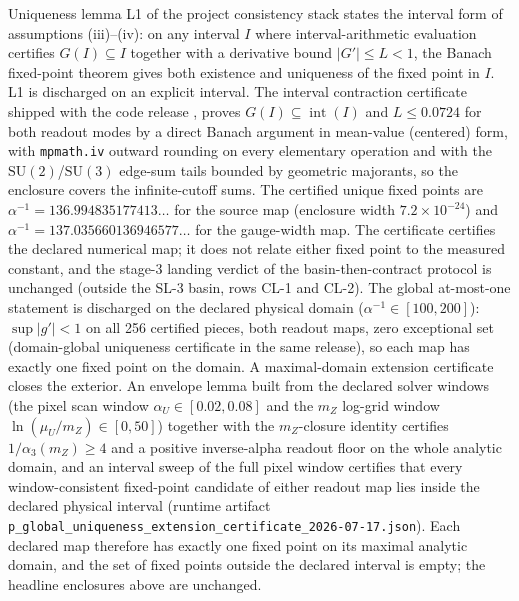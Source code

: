 \documentclass[11pt]{article}
\theoremstyle{remark}
\newcommand{\SU}{\mathrm{SU}}
\begin{document}
Uniqueness lemma L1 of the project consistency stack
states the interval form of assumptions
(iii)--(iv): on any interval \(I\) where interval-arithmetic evaluation
certifies \(G(I)\subseteq I\) together with a derivative bound
\(|G'|\le L<1\), the Banach fixed-point theorem gives both existence and
uniqueness of the fixed point in \(I\). L1 is discharged on an explicit
interval. The interval contraction certificate shipped with
the code release \cite{oph-code},
proves \(G(I)\subseteq\operatorname{int}(I)\) and \(L\le0.0724\) for both
readout modes by a direct Banach argument in mean-value (centered) form, with
\texttt{mpmath.iv} outward rounding on every elementary operation and with the
\(\SU(2)\)/\(\SU(3)\) edge-sum tails bounded by geometric majorants, so the
enclosure covers the infinite-cutoff sums. The certified unique fixed points
are \(\alpha^{-1}=136.994835177413\ldots\) for the source map (enclosure width
\(7.2\times10^{-24}\)) and \(\alpha^{-1}=137.035660136946577\ldots\) for the
gauge-width map. The certificate certifies the declared numerical map; it does
not relate either fixed point to the measured constant, and the stage-3
landing verdict of the basin-then-contract protocol is unchanged (outside the
SL-3 basin, rows CL-1 and CL-2). The global at-most-one statement is
discharged on the declared physical domain (\(\alpha^{-1}\in[100,200]\)):
\(\sup|g'|<1\) on all 256 certified pieces, both readout maps, zero
exceptional set
(domain-global uniqueness certificate in the same release), so
each map has exactly one fixed point on the domain.
A maximal-domain extension certificate closes the exterior. An envelope
lemma built from the declared solver windows (the pixel scan window
\(\alpha_U\in[0.02,0.08]\) and the \(m_Z\) log-grid window
\(\ln(\mu_U/m_Z)\in[0,50]\)) together with the \(m_Z\)-closure identity
certifies \(1/\alpha_3(m_Z)\ge 4\) and a positive inverse-alpha readout
floor on the whole analytic domain, and an interval sweep of the full pixel
window certifies that every window-consistent fixed-point candidate of
either readout map lies inside the declared physical interval
(runtime artifact
\texttt{p\_global\_uniqueness\_extension\_certificate\_2026-07-17.json}).
Each declared map therefore has exactly one fixed point on its maximal
analytic domain, and the set of fixed points outside the declared interval
is empty; the headline enclosures above are unchanged.
\end{document}
